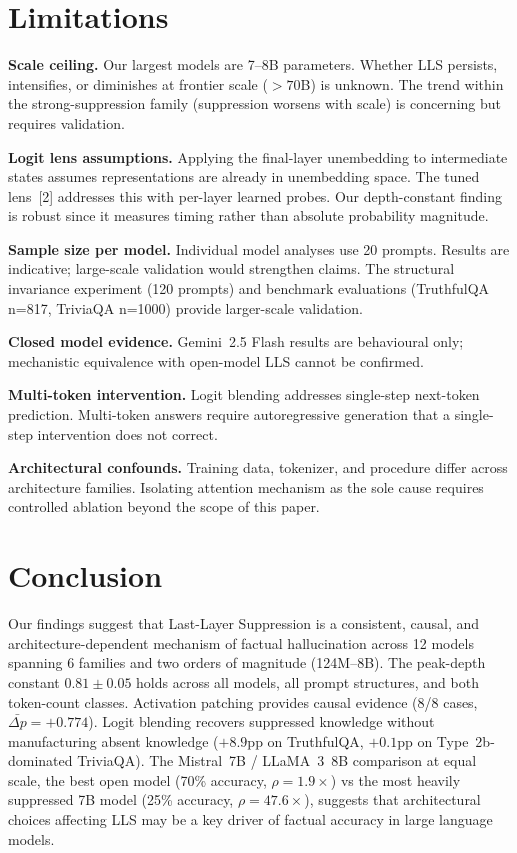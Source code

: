 \documentclass{article}
\begin{document}
\section{Limitations}

\textbf{Scale ceiling.} Our largest models are 7--8B parameters.
Whether LLS persists, intensifies, or diminishes at frontier scale
($>70$B) is unknown.
The trend within the strong-suppression family (suppression worsens with
scale) is concerning but requires validation.

\textbf{Logit lens assumptions.} Applying the final-layer unembedding to
intermediate states assumes representations are already in unembedding
space.
The tuned lens~[2] addresses this with per-layer learned probes.
Our depth-constant finding is robust since it measures timing rather
than absolute probability magnitude.

\textbf{Sample size per model.} Individual model analyses use 20 prompts.
Results are indicative; large-scale validation would strengthen claims.
The structural invariance experiment (120 prompts) and benchmark evaluations
(TruthfulQA n=817, TriviaQA n=1000) provide larger-scale validation.

\textbf{Closed model evidence.}
Gemini~2.5 Flash results are behavioural only; mechanistic equivalence
with open-model LLS cannot be confirmed.

\textbf{Multi-token intervention.}
Logit blending addresses single-step next-token prediction.
Multi-token answers require autoregressive generation that a single-step
intervention does not correct.

\textbf{Architectural confounds.}
Training data, tokenizer, and procedure differ across architecture families.
Isolating attention mechanism as the sole cause requires controlled
ablation beyond the scope of this paper.

\section{Conclusion}

Our findings suggest that Last-Layer Suppression is a consistent, causal,
and architecture-dependent mechanism of factual hallucination across 12
models spanning 6 families and two orders of magnitude (124M--8B).
The peak-depth constant $0.81\pm0.05$ holds across all models, all prompt
structures, and both token-count classes.
Activation patching provides causal evidence (8/8 cases, $\bar{\Delta p}=+0.774$).
Logit blending recovers suppressed knowledge without manufacturing absent
knowledge ($+8.9$pp on TruthfulQA, $+0.1$pp on Type~2b-dominated TriviaQA).
The Mistral~7B / LLaMA~3~8B comparison at equal scale, the best open model
(70\% accuracy, $\rho=1.9\times$) vs the most heavily suppressed 7B model
(25\% accuracy, $\rho=47.6\times$), suggests that architectural choices
affecting LLS may be a key driver of factual accuracy in large language models.
\end{document}
